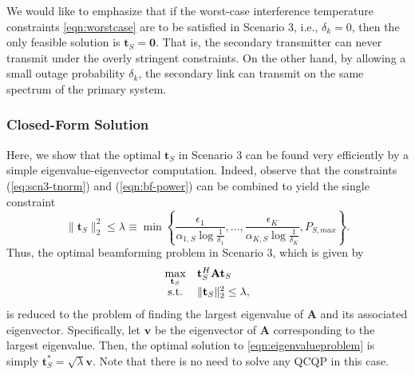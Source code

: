 \documentclass[twocolumn,10pt]{IEEEtran}
\theoremstyle{plain} \newtheorem{theorem}{Theorem}
\theoremstyle{plain} \newtheorem{proposition}{Proposition}
\theoremstyle{plain} \newtheorem{corollary}{Corollary}
\theoremstyle{remark} \newtheorem{remark}{Remark}
\theoremstyle{remark} \newtheorem{lemma}{Lemma}
\theoremstyle{plain} \newtheorem{definition}{Definition}
\theoremstyle{plain} \newtheorem{assumption}{Assumption}
\theoremstyle{plain} \newtheorem{fact}{Fact}
\begin{document}
We would like to emphasize that if the worst-case interference temperature constraints \eqref{eqn:worstcase} are to be satisfied in Scenario 3, i.e., $\delta_k=0$, then the only feasible solution is $\mathbf{t}_S=\mathbf{0}$. That is, the secondary transmitter can never transmit under the overly stringent constraints. On the other hand, by allowing a small outage probability $\delta_k$, the secondary link can transmit on the same spectrum of the primary system.

\subsubsection{\textbf{Closed-Form Solution}}

Here, we show that the optimal $\mathbf{t}_S$ in Scenario 3 can be found very efficiently by a simple eigenvalue-eigenvector computation.  Indeed, observe that the constraints (\ref{eq:scn3-tnorm}) and (\ref{eqn:bf-power}) can be combined to yield the single constraint
$$
   \|\mathbf{t}_S\|_2^2 \leq \lambda \equiv \min\left\{\frac{\epsilon_1}{\alpha_{1,S}\log\frac{1}{\delta_1}}, \ldots, \frac{\epsilon_K}{\alpha_{K,S}\log\frac{1}{\delta_K}}, P_{S,max}\right\}.
$$
Thus, the optimal beamforming problem in Scenario 3, which is given by
\begin{equation}\label{eqn:eigenvalueproblem}
   \begin{array}{c@{\quad}l}
      \displaystyle{\max_{\mathbf{t}_S}} & \mathbf{t}_S^H\mathbf{A}\mathbf{t}_S \\
\text{s.t.} & \|\mathbf{t}_S\|_2^2 \leq \lambda,
   \end{array}
\end{equation}
is reduced to the problem of finding the largest eigenvalue of $\mathbf{A}$ and its associated eigenvector.  Specifically, let $\mathbf{v}$ be the eigenvector of $\mathbf{A}$ corresponding to the largest eigenvalue.  Then, the optimal solution to \eqref{eqn:eigenvalueproblem} is simply $\mathbf{t}_S^*=\sqrt{\lambda}\mathbf{v}$.  Note that there is no need to solve any QCQP in this case.
\end{document}
